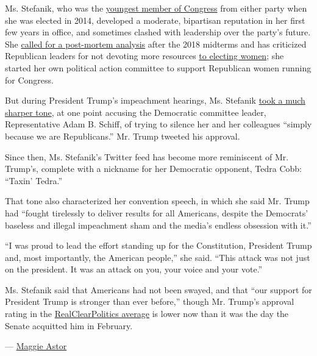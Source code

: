 Ms. Stefanik, who was the
\href{https://www.nytimes3xbfgragh.onion/2014/10/29/nyregion/in-upstate-new-york-house-race-republican-makes-her-youth-a-selling-point.html}{youngest
member of Congress} from either party when she was elected in 2014,
developed a moderate, bipartisan reputation in her first few years in
office, and sometimes clashed with leadership over the party's future.
She
\href{https://www.nytimes3xbfgragh.onion/2018/12/20/nyregion/elise-stefanik-republican-women.html}{called
for a post-mortem analysis} after the 2018 midterms and has criticized
Republican leaders for not devoting more resources
\href{https://www.nytimes3xbfgragh.onion/2019/07/09/us/politics/republican-women-congress.html}{to
electing women}; she started her own political action committee to
support Republican women running for Congress.

But during President Trump's impeachment hearings, Ms. Stefanik
\href{https://www.nytimes3xbfgragh.onion/2019/11/18/nyregion/elise-stefanik-tedra-cobb-impeachment.html}{took
a much sharper tone}, at one point accusing the Democratic committee
leader, Representative Adam B. Schiff, of trying to silence her and her
colleagues ``simply because we are Republicans.'' Mr. Trump tweeted his
approval.

Since then, Ms. Stefanik's Twitter feed has become more reminiscent of
Mr. Trump's, complete with a nickname for her Democratic opponent, Tedra
Cobb: ``Taxin' Tedra.''

That tone also characterized her convention speech, in which she said
Mr. Trump had ``fought tirelessly to deliver results for all Americans,
despite the Democrats' baseless and illegal impeachment sham and the
media's endless obsession with it.''

``I was proud to lead the effort standing up for the Constitution,
President Trump and, most importantly, the American people,'' she said.
``This attack was not just on the president. It was an attack on you,
your voice and your vote.''

Ms. Stefanik said that Americans had not been swayed, and that ``our
support for President Trump is stronger than ever before,'' though Mr.
Trump's approval rating in the
\href{https://www.realclearpolitics.com/epolls/other/president_trump_job_approval-6179.html}{RealClearPolitics
average} is lower now than it was the day the Senate acquitted him in
February.

--- \href{https://www.nytimes3xbfgragh.onion/by/maggie-astor}{Maggie
Astor}

